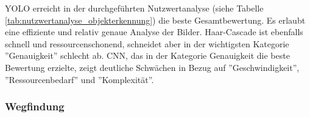 \documentclass[../main.tex]{subfiles}
\begin{document}
\begin{table}[H]
    \caption{Nutzwertanalyse Objekterkennung}
    \label{tab:nutzwertanalyse_objekterkennung}
\end{table}

YOLO erreicht in der durchgeführten Nutzwertanalyse (siehe Tabelle \ref{tab:nutzwertanalyse_objekterkennung}) die beste Gesamtbewertung. Es erlaubt eine effiziente und relativ genaue Analyse der Bilder.
Haar-Cascade ist ebenfalls schnell und ressourcenschonend, schneidet aber in der wichtigsten Kategorie ''Genauigkeit'' schlecht ab.
CNN, das in der Kategorie Genauigkeit die beste Bewertung erzielte, zeigt deutliche Schwächen in Bezug auf ''Geschwindigkeit'', ''Ressourcenbedarf'' und ''Komplexität''.

\subsubsection{Wegfindung}
\end{document}
